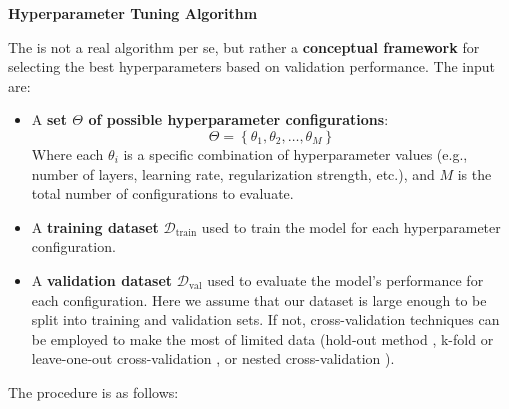 \begin{flushleft}
    \textcolor{Green3}{ \textbf{Hyperparameter Tuning Algorithm}}
\end{flushleft}
The  is not a real algorithm per se, but rather a \textbf{conceptual framework} for selecting the best hyperparameters based on validation performance. The input are:
\begin{itemize}
    \item A \textbf{set $\Theta$ of possible hyperparameter configurations}:
    \begin{equation*}
        \Theta = \left\{\theta_1, \theta_2, \dots, \theta_M\right\}
    \end{equation*}
    Where each $\theta_i$ is a specific combination of hyperparameter values (e.g., number of layers, learning rate, regularization strength, etc.), and $M$ is the total number of configurations to evaluate.
    \item A \textbf{training dataset} $\mathcal{D}_{\text{train}}$ used to train the model for each hyperparameter configuration.
    \item A \textbf{validation dataset} $\mathcal{D}_{\text{val}}$ used to evaluate the model's performance for each configuration. Here we assume that our dataset is large enough to be split into training and validation sets. If not, cross-validation techniques can be employed to make the most of limited data (hold-out method , k-fold  or leave-one-out cross-validation , or nested cross-validation ).
\end{itemize}
The procedure is as follows:
